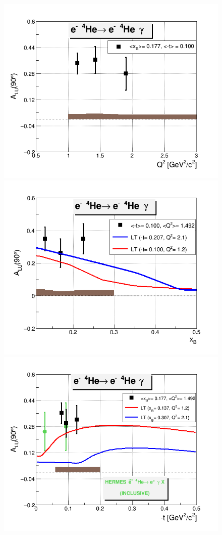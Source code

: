 \begin{figure}[tpb]
\centering
\includegraphics[scale=0.37]{fig_ch5/coh_alu_Q2_90.png} \\
\includegraphics[scale=0.37]{fig_ch5/coh_alu_xB_90.png} \\
\includegraphics[scale=0.37]{fig_ch5/coh_alu_t_90.png} 

\end{figure}
